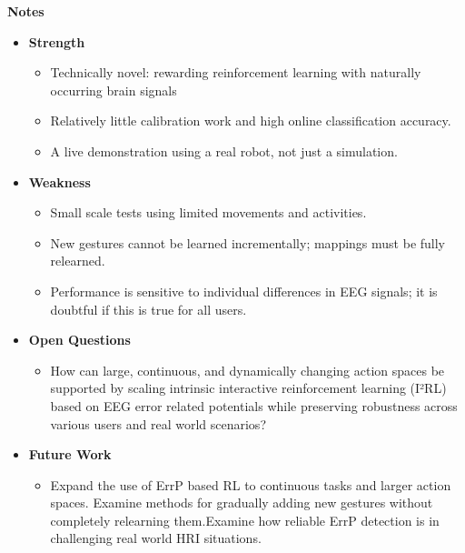 \documentclass[report.tex]{subfiles}
\begin{document}
\noindent\textbf{Notes}
\begin{itemize}
    \item \noindent\textbf {Strength}
    \begin{itemize}
        \item Technically novel: rewarding reinforcement learning with naturally occurring brain signals 
       
        \item Relatively little calibration work and high online classification accuracy.
        \item  A live demonstration using a real robot, not just a simulation.
    \end{itemize}
    
    \item \noindent\textbf{Weakness}
    \begin{itemize}
        \item  Small scale tests using limited movements and activities.
    
        \item New gestures cannot be learned incrementally; mappings must be fully relearned.
        \item Performance is sensitive to individual differences in EEG signals; it is doubtful if this is true for all users.
    \end{itemize}
\end{itemize}

\begin{itemize}
    \item \noindent\textbf {Open Questions}
    \begin{itemize}
        \item  How can large, continuous, and dynamically changing action spaces be supported by scaling intrinsic interactive reinforcement learning (I²RL) based on EEG error related potentials while preserving robustness across various users and real world scenarios?

    \end{itemize}
    
    \item \noindent\textbf{Future Work}
    \begin{itemize}
        \item  Expand the use of ErrP based RL to continuous tasks and larger action spaces. Examine methods for gradually adding new gestures without completely relearning them.Examine how reliable ErrP detection is in challenging real world HRI situations.
        
    \end{itemize}
\end{itemize}
\end{document}
